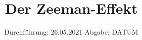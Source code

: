 



\subject{V27}  %
\title{Der Zeeman-Effekt} %
\date{%
  Durchführung: 26.05.2021
  \hspace{3em}
  Abgabe: DATUM
}



\maketitle
\thispagestyle{empty}
\tableofcontents
\newpage







\printbibliography{}


